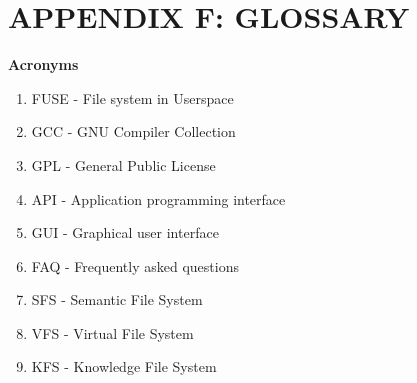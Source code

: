 \section{APPENDIX F: GLOSSARY}

\noindent \textbf{Acronyms} 
\begin{enumerate}
\item FUSE - File system in Userspace
\item GCC  - GNU Compiler Collection
\item GPL  - General Public License
\item API  - Application programming interface
\item GUI  - Graphical user interface
\item FAQ  - Frequently asked questions 
\item SFS  - Semantic File System
\item VFS  - Virtual File System
\item KFS  - Knowledge File System
\\
\end{enumerate}


